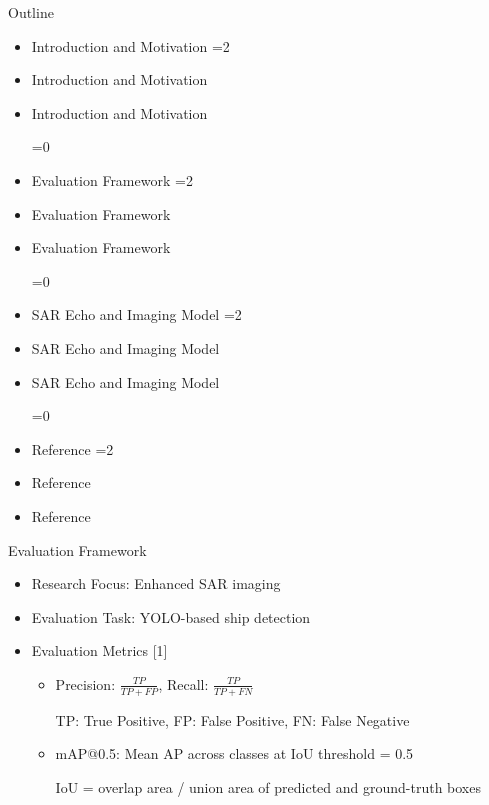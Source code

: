 \documentclass[aspectratio=169, 11pt]{beamer}
\newcommand{\dsrlabActiveSec}{0}
\newcommand{\dsrlaboutlineitem}[2]{%
  \ifnum\dsrlabActiveSec=0
    \item #2
  \else
    \ifnum#1=\dsrlabActiveSec
      \item #2
    \else
      \item {\color{dsrlabGrayLabel}#2}
    \fi
  \fi
}
\newcommand{\dsrlabSectionOutline}[1]{%
  \renewcommand{\dsrlabActiveSec}{#1}%
  \begin{frame}{Outline}
    \begin{itemize}
      \dsrlaboutlineitem{1}{Introduction and Motivation}
      \dsrlaboutlineitem{2}{Evaluation Framework}
      \dsrlaboutlineitem{3}{SAR Echo and Imaging Model}
      \dsrlaboutlineitem{4}{Reference}
    \end{itemize}
  \end{frame}
}
\begin{document}
\dsrlabSectionOutline{2}

\begin{frame}{Evaluation Framework}
  \begin{itemize}
    \item Research Focus: Enhanced SAR imaging
    \item Evaluation Task: YOLO-based ship detection
  \end{itemize}
  \hspace{-0.7cm}
  \resizebox{1.1\textwidth}{!}{}
  \vspace{-0.5cm}
  \begin{itemize}
    \item Evaluation Metrics [1]
    \begin{itemize}
      \item Precision: $\frac{TP}{TP+FP}$, Recall: $\frac{TP}{TP+FN}$

      {\footnotesize TP: True Positive, FP: False Positive, FN: False Negative}

      \item mAP@0.5: Mean AP across classes at IoU threshold = 0.5

      {\footnotesize IoU = overlap area / union area of predicted and ground-truth boxes}
    \end{itemize}
  \end{itemize}
\end{frame}
\end{document}

